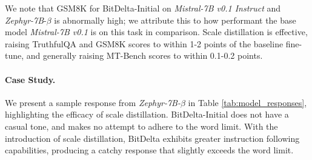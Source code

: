 \documentclass[numbers]{article}
\newcommand{\oursmethod}{BitDelta\xspace}
\begin{document}
We note that GSM8K for \oursmethod -Initial on \textit{Mistral-7B v0.1 Instruct} and \textit{Zephyr-7B}-$\beta$ is abnormally high; we attribute this to how performant the base model \textit{Mistral-7B v0.1} is on this task in comparison. Scale distillation is effective, raising TruthfulQA and GSM8K scores to within 1-2 points of the baseline fine-tune, and generally raising MT-Bench scores to within 0.1-0.2 points.


\begin{table}[tbp]
    \centering
    \caption{We apply \oursmethod to \textit{Llama 2-7B Chat} (with corresponding base model \textit{Llama 2-7B}), and find it holds up when the underlying base model is quantized at various levels. %
    }
    \label{quant-results}
    
\end{table}


\paragraph{Case Study. }
We present a sample response from \textit{Zephyr-7B-}$\beta$ in Table \ref{tab:model_responses}, highlighting the efficacy of scale distillation. \oursmethod -Initial does not have a casual tone, and makes no attempt to adhere to the word limit. With the introduction of scale distillation, \oursmethod exhibits greater instruction following capabilities, producing a catchy response that slightly exceeds the word limit.
\end{document}
